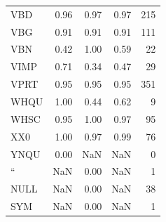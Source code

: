 \documentclass[
  letterpaper,
  DIV=11,
  numbers=noendperiod]{scrreprt}
\begin{document}
\begin{longtable}[]{@{}lrrrr@{}}
VBD & 0.96 & 0.97 & 0.97 & 215 \\
VBG & 0.91 & 0.91 & 0.91 & 111 \\
VBN & 0.42 & 1.00 & 0.59 & 22 \\
VIMP & 0.71 & 0.34 & 0.47 & 29 \\
VPRT & 0.95 & 0.95 & 0.95 & 351 \\
WHQU & 1.00 & 0.44 & 0.62 & 9 \\
WHSC & 0.95 & 1.00 & 0.97 & 95 \\
XX0 & 1.00 & 0.97 & 0.99 & 76 \\
YNQU & 0.00 & NaN & NaN & 0 \\
`` & NaN & 0.00 & NaN & 1 \\
NULL & NaN & 0.00 & NaN & 38 \\
SYM & NaN & 0.00 & NaN & 1 \\
\end{longtable}
\end{document}
